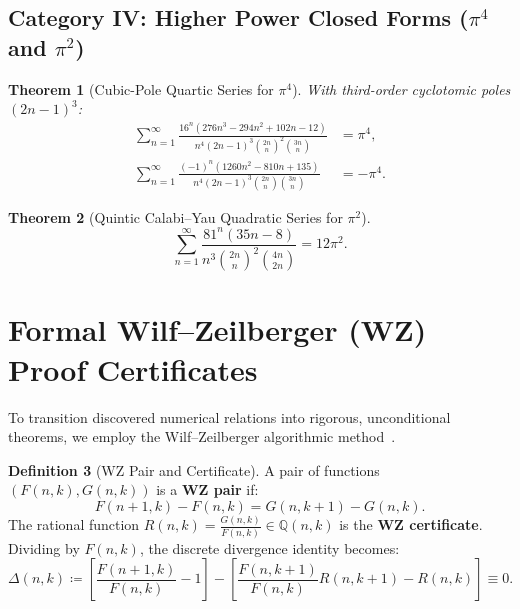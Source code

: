 \documentclass[11pt,a4paper]{article}
\newtheorem{theorem}{Theorem}[section]
\theoremstyle{definition}
\newtheorem{definition}[theorem]{Definition}
\begin{document}
\subsection{Category IV: Higher Power Closed Forms ($\pi^4$ and $\pi^2$)}

\begin{theorem}[Cubic-Pole Quartic Series for $\pi^4$]
With third-order cyclotomic poles $(2n-1)^3$:
\begin{align}
\sum_{n=1}^\infty \frac{16^n \left( 276 n^3 - 294 n^2 + 102 n - 12 \right)}{n^4 (2n-1)^3 \binom{2n}{n}^2 \binom{3n}{n}} &= \pi^4, \label{eq:pi4_1} \\
\sum_{n=1}^\infty \frac{(-1)^n \left( 1260 n^2 - 810 n + 135 \right)}{n^4 (2n-1)^3 \binom{2n}{n} \binom{3n}{n}} &= -\pi^4. \label{eq:pi4_2}
\end{align}
\end{theorem}

\begin{theorem}[Quintic Calabi--Yau Quadratic Series for $\pi^2$]
\begin{equation}\label{eq:pi2_1}
\sum_{n=1}^\infty \frac{81^n \left( 35 n - 8 \right)}{n^3 \binom{2n}{n}^2 \binom{4n}{2n}} = 12 \pi^2.
\end{equation}
\end{theorem}

\section{Formal Wilf--Zeilberger (WZ) Proof Certificates}

To transition discovered numerical relations into rigorous, unconditional theorems, we employ the Wilf--Zeilberger algorithmic method~\cite{zeilberger1990,wilf1992}.

\begin{definition}[WZ Pair and Certificate]
A pair of functions $(F(n, k), G(n, k))$ is a \textbf{WZ pair} if:
\begin{equation}
F(n+1, k) - F(n, k) = G(n, k+1) - G(n, k).
\end{equation}
The rational function $R(n, k) = \frac{G(n, k)}{F(n, k)} \in \mathbb{Q}(n, k)$ is the \textbf{WZ certificate}. Dividing by $F(n, k)$, the discrete divergence identity becomes:
\begin{equation}
\Delta(n, k) \coloneqq \left[ \frac{F(n+1, k)}{F(n, k)} - 1 \right] - \left[ \frac{F(n, k+1)}{F(n, k)} R(n, k+1) - R(n, k) \right] \equiv 0.
\end{equation}
\end{definition}
\end{document}
